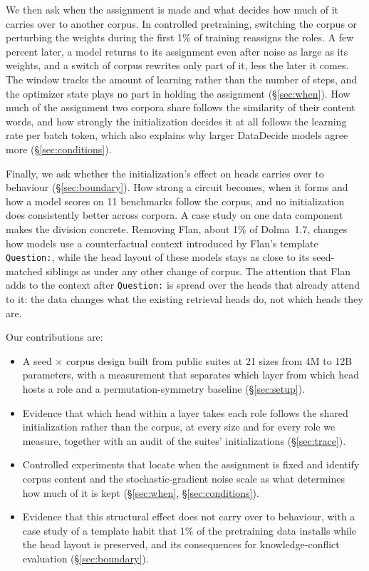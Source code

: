 \documentclass[11pt]{article}
\newcommand{\tmpl}[1]{\texttt{#1}}
\begin{document}
We then ask when the assignment is made and what decides how much of it carries over to another corpus.
In controlled pretraining, switching the corpus or perturbing the weights during the first 1\% of training reassigns the roles.
A few percent later, a model returns to its assignment even after noise as large as its weights, and a switch of corpus rewrites only part of it, less the later it comes.
The window tracks the amount of learning rather than the number of steps, and the optimizer state plays no part in holding the assignment (\S\ref{sec:when}).
How much of the assignment two corpora share follows the similarity of their content words, and how strongly the initialization decides it at all follows the learning rate per batch token, which also explains why larger DataDecide models agree more (\S\ref{sec:conditions}).

Finally, we ask whether the initialization's effect on heads carries over to behaviour (\S\ref{sec:boundary}).
How strong a circuit becomes, when it forms and how a model scores on 11 benchmarks follow the corpus, and no initialization does consistently better across corpora.
A case study on one data component makes the division concrete.
Removing Flan, about 1\% of Dolma~1.7, changes how models use a counterfactual context introduced by Flan's template \tmpl{Question:}, while the head layout of these models stays as close to its seed-matched siblings as under any other change of corpus.
The attention that Flan adds to the context after \tmpl{Question:} is spread over the heads that already attend to it: the data changes what the existing retrieval heads do, not which heads they are.

Our contributions are:
\begin{itemize}[leftmargin=*,itemsep=1pt,topsep=2pt]
  \item A seed $\times$ corpus design built from public suites at 21 sizes from 4M to 12B parameters, with a measurement that separates which layer from which head hosts a role and a permutation-symmetry baseline (\S\ref{sec:setup}).
  \item Evidence that which head within a layer takes each role follows the shared initialization rather than the corpus, at every size and for every role we measure, together with an audit of the suites' initializations (\S\ref{sec:trace}).
  \item Controlled experiments that locate when the assignment is fixed and identify corpus content and the stochastic-gradient noise scale as what determines how much of it is kept (\S\ref{sec:when}, \S\ref{sec:conditions}).
  \item Evidence that this structural effect does not carry over to behaviour, with a case study of a template habit that 1\% of the pretraining data installs while the head layout is preserved, and its consequences for knowledge-conflict evaluation (\S\ref{sec:boundary}).
\end{itemize}
\end{document}
